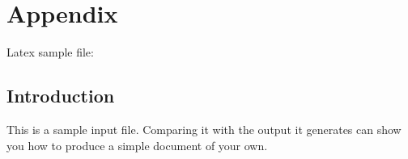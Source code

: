 
\chapter{Appendix}

Latex sample file:  

\section{Introduction}
This is a sample input file.  Comparing it with the output it
generates can show you how to produce a simple document of
your own.

%
%
%
%

